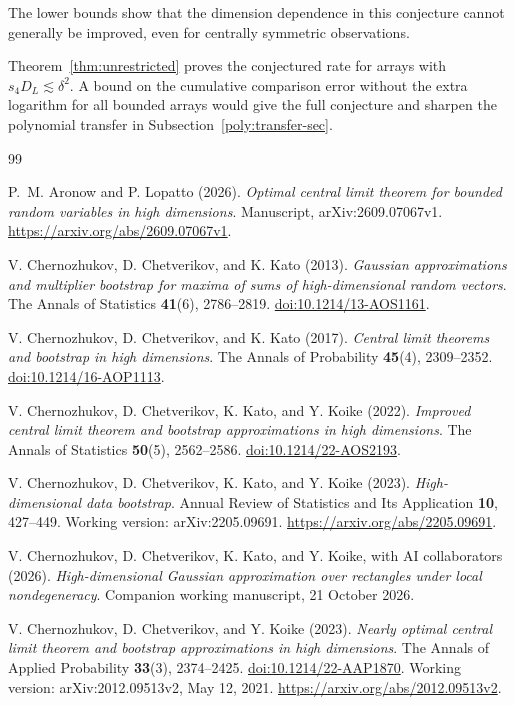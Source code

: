 \documentclass[11pt,letterpaper]{article}
\theoremstyle{remark}
\begin{document}
The lower bounds show that the dimension dependence in this conjecture
cannot generally be improved, even for centrally symmetric observations.


Theorem~\ref{thm:unrestricted} proves the conjectured rate for arrays with $s_4D_L\lesssim\delta^2$. A bound on the cumulative comparison error without the extra logarithm for all bounded arrays would give the full conjecture
and sharpen the polynomial transfer in Subsection~\ref{poly:transfer-sec}.

\begin{thebibliography}{99}
\setlength{\itemsep}{1pt}
{}
P.~M. Aronow and P. Lopatto (2026).
\emph{Optimal central limit theorem for bounded random variables in high dimensions}.
Manuscript, arXiv:2609.07067v1.
\url{https://arxiv.org/abs/2609.07067v1}.

V. Chernozhukov, D. Chetverikov, and K. Kato (2013).
\emph{Gaussian approximations and multiplier bootstrap for maxima of
sums of high-dimensional random vectors}.
The Annals of Statistics \textbf{41}(6), 2786--2819.
\href{https://doi.org/10.1214/13-AOS1161}{doi:10.1214/13-AOS1161}.

V. Chernozhukov, D. Chetverikov, and K. Kato (2017).
\emph{Central limit theorems and bootstrap in high dimensions}.
The Annals of Probability \textbf{45}(4), 2309--2352.
\href{https://doi.org/10.1214/16-AOP1113}{doi:10.1214/16-AOP1113}.

V. Chernozhukov, D. Chetverikov, K. Kato, and Y. Koike (2022).
\emph{Improved central limit theorem and bootstrap approximations in
high dimensions}. The Annals of Statistics \textbf{50}(5), 2562--2586.
\href{https://doi.org/10.1214/22-AOS2193}{doi:10.1214/22-AOS2193}.

V. Chernozhukov, D. Chetverikov, K. Kato, and Y. Koike (2023).
\emph{High-dimensional data bootstrap}.
Annual Review of Statistics and Its Application \textbf{10}, 427--449.
Working version: arXiv:2205.09691.
\url{https://arxiv.org/abs/2205.09691}.

V. Chernozhukov, D. Chetverikov, K. Kato, and Y. Koike,
with AI collaborators (2026).
\emph{High-dimensional Gaussian approximation over rectangles under
local nondegeneracy}. Companion working manuscript, 21 October 2026.

V. Chernozhukov, D. Chetverikov, and Y. Koike (2023).
\emph{Nearly optimal central limit theorem and bootstrap approximations
in high dimensions}.
The Annals of Applied Probability \textbf{33}(3), 2374--2425.
\href{https://doi.org/10.1214/22-AAP1870}{doi:10.1214/22-AAP1870}.
Working version: arXiv:2012.09513v2, May 12, 2021.
\url{https://arxiv.org/abs/2012.09513v2}.


\end{thebibliography}
\end{document}
